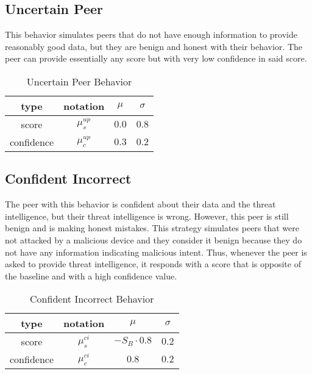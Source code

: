 \subsection{Uncertain Peer}
\label{subsubsec:uncertain-peer}
This behavior simulates peers that do not have enough information to provide reasonably good data, but they are benign and honest with their behavior.
The peer can provide essentially any score but with very low confidence in said score.

\begin{table}[!ht]
    \centering
    \begin{tabular}{c|c|c|c}
        type & notation & $\mu$ & $\sigma$ \\
        \hline
        score & $\mu^{up}_{s}$ & $0.0$ & $0.8$ \\
        confidence & $\mu^{up}_{c}$ &  $0.3$ & $0.2$ \\
    \end{tabular}
    \caption{Uncertain Peer Behavior}
    \label{tab:uncertain-peer}
\end{table}

\subsection{Confident Incorrect}
\label{subsubsec:confident-incorrect-peer}
The peer with this behavior is confident about their data and the threat intelligence, but their threat intelligence is wrong.
However, this peer is still benign and is making honest mistakes.
This strategy simulates peers that were not attacked by a malicious device and they consider it benign because they do not have any information indicating malicious intent.
Thus, whenever the peer is asked to provide threat intelligence, it responds with a score that is opposite of the baseline and with a high confidence value.

\begin{table}[!ht]
    \centering
    \begin{tabular}{c|c|c|c}
        type & notation & $\mu$ & $\sigma$ \\
        \hline
        score & $\mu^{ci}_{s}$ & $-S_{B} \cdot 0.8$ & $0.2$ \\
        confidence & $\mu^{ci}_{c}$ &  $0.8$ & $0.2$ \\
    \end{tabular}
    \caption{Confident Incorrect Behavior}
    \label{tab:confident-incorrect}
\end{table}


